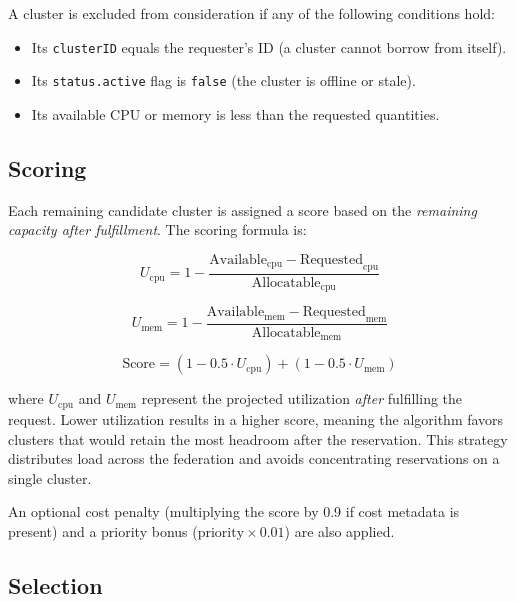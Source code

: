 A cluster is excluded from consideration if any of the following conditions hold:
\begin{itemize}
    \item Its \texttt{clusterID} equals the requester's ID (a cluster cannot borrow from itself).
    \item Its \texttt{status.active} flag is \texttt{false} (the cluster is offline or stale).
    \item Its available CPU or memory is less than the requested quantities.
\end{itemize}

\subsection{Scoring}

Each remaining candidate cluster is assigned a score based on the \emph{remaining capacity after fulfillment}. The scoring formula is:

\begin{equation}
\label{eq:cpu-util}
U_{\text{cpu}} = 1 - \frac{\text{Available}_{\text{cpu}} - \text{Requested}_{\text{cpu}}}{\text{Allocatable}_{\text{cpu}}}
\end{equation}

\begin{equation}
\label{eq:mem-util}
U_{\text{mem}} = 1 - \frac{\text{Available}_{\text{mem}} - \text{Requested}_{\text{mem}}}{\text{Allocatable}_{\text{mem}}}
\end{equation}

\begin{equation}
\label{eq:score}
\text{Score} = \left(1 - 0.5 \cdot U_{\text{cpu}}\right) + \left(1 - 0.5 \cdot U_{\text{mem}}\right)
\end{equation}

\noindent where $U_{\text{cpu}}$ and $U_{\text{mem}}$ represent the projected utilization \emph{after} fulfilling the request. Lower utilization results in a higher score, meaning the algorithm favors clusters that would retain the most headroom after the reservation. This strategy distributes load across the federation and avoids concentrating reservations on a single cluster.

An optional cost penalty (multiplying the score by 0.9 if cost metadata is present) and a priority bonus ($\text{priority} \times 0.01$) are also applied.

\subsection{Selection}

